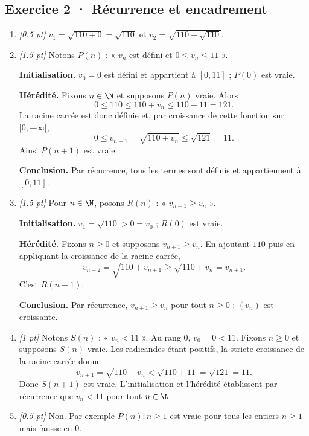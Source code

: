 \subsection*{Exercice 2 · Récurrence et encadrement}\begin{enumerate}

\item \textit{[\num{0,5} pt]} $v_1=\sqrt{110+0}=\sqrt{110}$ et $v_2=\sqrt{110+\sqrt{110}}$.

\item \textit{[\num{1,5} pt]} Notons $P(n)$ : « $v_n$ est défini et $0\le v_n\le 11$ ».
\par\smallskip\textbf{Initialisation.} $v_0=0$ est défini et appartient à $[0,11]$ ; $P(0)$ est vraie.
\par\smallskip\textbf{Hérédité.} Fixons $n\in\N$ et supposons $P(n)$ vraie. Alors
\[0\le 110\le 110+v_n\le 110+11=121.\]
La racine carrée est donc définie et, par croissance de cette fonction sur $[0,+\infty[$,
\[0\le v_{n+1}=\sqrt{110+v_n}\le\sqrt{121}=11.\]
Ainsi $P(n+1)$ est vraie.
\par\smallskip\textbf{Conclusion.} Par récurrence, tous les termes sont définis et appartiennent à $[0,11]$.

\item \textit{[\num{1,5} pt]} Pour $n\in\N$, posons $R(n)$ : « $v_{n+1}\ge v_n$ ».
\par\smallskip\textbf{Initialisation.} $v_1=\sqrt{110}>0=v_0$ ; $R(0)$ est vraie.
\par\smallskip\textbf{Hérédité.} Fixons $n\ge0$ et supposons $v_{n+1}\ge v_n$. En ajoutant $110$ puis en appliquant la croissance de la racine carrée,
\[v_{n+2}=\sqrt{110+v_{n+1}}\ge\sqrt{110+v_n}=v_{n+1}.\]
C'est $R(n+1)$.
\par\smallskip\textbf{Conclusion.} Par récurrence, $v_{n+1}\ge v_n$ pour tout $n\ge0$ : $(v_n)$ est croissante.

\item \textit{[1 pt]} Notons $S(n)$ : « $v_n<11$ ». Au rang $0$, $v_0=0<11$.
Fixons $n\ge0$ et supposons $S(n)$ vraie. Les radicandes étant positifs, la stricte croissance de la racine carrée donne
\[v_{n+1}=\sqrt{110+v_n}<\sqrt{110+11}=\sqrt{121}=11.\]
Donc $S(n+1)$ est vraie. L'initialisation et l'hérédité établissent par récurrence que $v_n<11$ pour tout $n\in\N$.

\item \textit{[\num{0,5} pt]} Non. Par exemple $P(n):n\ge1$ est vraie pour tous les entiers $n\ge1$ mais fausse en $0$.

\end{enumerate}


